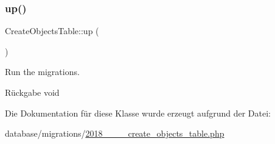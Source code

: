 \subsubsection{\texorpdfstring{up()}{up()}}
{\footnotesize\ttfamily Create\+Objects\+Table\+::up (\begin{DoxyParamCaption}{ }\end{DoxyParamCaption})}

Run the migrations.

\begin{DoxyReturn}{Rückgabe}
void 
\end{DoxyReturn}


Die Dokumentation für diese Klasse wurde erzeugt aufgrund der Datei\+:\begin{DoxyCompactItemize}
\item 
database/migrations/\hyperlink{2018__06__15__144445__create__objects__table_8php}{2018\+\_\+\_\+\_\+\_\+create\+\_\+objects\+\_\+table.\+php}\end{DoxyCompactItemize}
